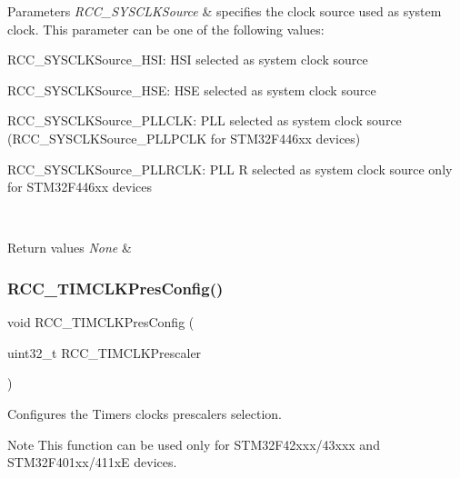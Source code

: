 \begin{DoxyParams}{Parameters}
{\em R\+C\+C\+\_\+\+S\+Y\+S\+C\+L\+K\+Source} & specifies the clock source used as system clock. This parameter can be one of the following values\+: \begin{DoxyItemize}
\item R\+C\+C\+\_\+\+S\+Y\+S\+C\+L\+K\+Source\+\_\+\+H\+SI\+: H\+SI selected as system clock source \item R\+C\+C\+\_\+\+S\+Y\+S\+C\+L\+K\+Source\+\_\+\+H\+SE\+: H\+SE selected as system clock source \item R\+C\+C\+\_\+\+S\+Y\+S\+C\+L\+K\+Source\+\_\+\+P\+L\+L\+C\+LK\+: P\+LL selected as system clock source (R\+C\+C\+\_\+\+S\+Y\+S\+C\+L\+K\+Source\+\_\+\+P\+L\+L\+P\+C\+LK for S\+T\+M32\+F446xx devices) \item R\+C\+C\+\_\+\+S\+Y\+S\+C\+L\+K\+Source\+\_\+\+P\+L\+L\+R\+C\+LK\+: P\+LL R selected as system clock source only for S\+T\+M32\+F446xx devices \end{DoxyItemize}
\\
\hline
\end{DoxyParams}

\begin{DoxyRetVals}{Return values}
{\em None} & \\
\hline
\end{DoxyRetVals}
\mbox{\label{group___r_c_c_gaf0599100e7afdf8ed988e351a899e922}} 
\subsubsection{\texorpdfstring{R\+C\+C\+\_\+\+T\+I\+M\+C\+L\+K\+Pres\+Config()}{RCC\_TIMCLKPresConfig()}}
{\footnotesize\ttfamily void R\+C\+C\+\_\+\+T\+I\+M\+C\+L\+K\+Pres\+Config (\begin{DoxyParamCaption}\item[{uint32\+\_\+t}]{R\+C\+C\+\_\+\+T\+I\+M\+C\+L\+K\+Prescaler }\end{DoxyParamCaption})}



Configures the Timers clocks prescalers selection. 

\begin{DoxyNote}{Note}
This function can be used only for S\+T\+M32\+F42xxx/43xxx and S\+T\+M32\+F401xx/411xE devices.
\end{DoxyNote}

